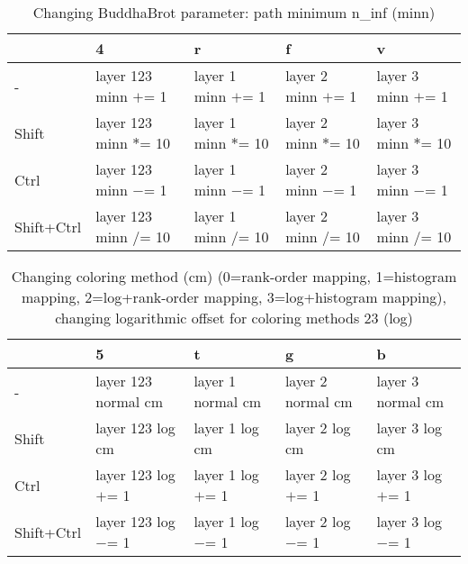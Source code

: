 \documentclass[10pt,a4paper]{article}
\begin{document}
\begin{table}[h!]
    \caption{Changing BuddhaBrot parameter: path minimum n\_inf (minn)}
    \setlength{\tabcolsep}{0.0pt}
    \begin{tabularx}{\linewidth}{LLLLL}
        \toprule
                   & 4                      & r                    & f                    & v                    \\
        \midrule                                                                          
        -          & layer 123 minn $+$= 1  & layer 1 minn $+$= 1  & layer 2 minn $+$= 1  & layer 3 minn $+$= 1  \\
        Shift      & layer 123 minn $*$= 10 & layer 1 minn $*$= 10 & layer 2 minn $*$= 10 & layer 3 minn $*$= 10 \\
        Ctrl       & layer 123 minn $-$= 1  & layer 1 minn $-$= 1  & layer 2 minn $-$= 1  & layer 3 minn $-$= 1  \\
        Shift+Ctrl & layer 123 minn $/$= 10 & layer 1 minn $/$= 10 & layer 2 minn $/$= 10 & layer 3 minn $/$= 10 \\
        \bottomrule
    \end{tabularx}
\end{table}

\begin{table}[h!]
    \caption{Changing coloring method (cm) (0=rank-order mapping, 1=histogram mapping, 2=log+rank-order mapping, 3=log+histogram mapping), changing logarithmic offset for coloring methods 23 (log)}
    \setlength{\tabcolsep}{0.0pt}
    \begin{tabularx}{\linewidth}{LLLLL}
        \toprule
                   & 5                    & t                  & g                  & b                  \\
        \midrule                                                                          
        -          & layer 123 normal cm  & layer 1 normal cm  & layer 2 normal cm  & layer 3 normal cm  \\
        Shift      & layer 123 log cm     & layer 1 log cm     & layer 2 log cm     & layer 3 log cm     \\
        Ctrl       & layer 123 log $+$= 1 & layer 1 log $+$= 1 & layer 2 log $+$= 1 & layer 3 log $+$= 1 \\
        Shift+Ctrl & layer 123 log $-$= 1 & layer 1 log $-$= 1 & layer 2 log $-$= 1 & layer 3 log $-$= 1 \\
        \bottomrule
    \end{tabularx}
\end{table}
\end{document}
